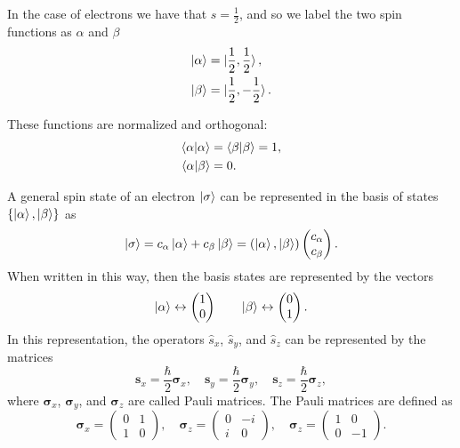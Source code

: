 \documentclass[../Main/chem532-notes.tex]{subfiles}
\begin{document}
In the case of electrons we have that $s = \frac{1}{2}$, and so we label the two spin functions as $\alpha$ and $\beta$
\begin{align}
\ket{\alpha} &= \ket{\frac{1}{2},\frac{1}{2}}, \\
\ket{\beta} &= \ket{\frac{1}{2},-\frac{1}{2}}.
\end{align}

These functions are normalized and orthogonal:
\begin{align}
\braket{\alpha | \alpha} &= \braket{\beta | \beta} = 1, \\
\braket{\alpha | \beta} &= 0. \label{eq:spin_orthogonality}
\end{align}

A general spin state of an electron $\ket{\sigma}$ can be represented in the basis of states $\{ \ket{\alpha}, \ket{\beta} \}$ as
\begin{equation}
\ket{\sigma} = c_\alpha \ket{\alpha} + c_\beta \ket{\beta} = ( \ket{\alpha}, \ket{\beta})
\begin{pmatrix}
c_\alpha \\
c_\beta
\end{pmatrix}.
\end{equation}
When written in this way, then the basis states are represented by the vectors
\begin{equation}
\ket{\alpha} \leftrightarrow 
\begin{pmatrix}
1 \\
0
\end{pmatrix}
\quad \quad
\ket{\beta} \leftrightarrow 
\begin{pmatrix}
0 \\
1
\end{pmatrix}.
\end{equation}
In this representation, the operators $\hat{s}_x$, $\hat{s}_y$, and $\hat{s}_z$ can be represented by the matrices
\begin{equation}
\mathbf{s}_x = \frac{\hbar}{2} \boldsymbol{\sigma}_x, \quad
\mathbf{s}_y = \frac{\hbar}{2} \boldsymbol{\sigma}_y, \quad
\mathbf{s}_z = \frac{\hbar}{2} \boldsymbol{\sigma}_z,
\end{equation}
where $\boldsymbol{\sigma}_x$, $\boldsymbol{\sigma}_y$, and $\boldsymbol{\sigma}_z$ are called Pauli matrices.
The Pauli matrices are defined as
\begin{equation}
\boldsymbol{\sigma}_x = 
\begin{pmatrix}
0 & 1 \\
1 & 0
\end{pmatrix}, \quad
\boldsymbol{\sigma}_z = 
\begin{pmatrix}
0 & -i \\
i & 0
\end{pmatrix}, \quad
\boldsymbol{\sigma}_z = 
\begin{pmatrix}
1 & 0 \\
0 & -1
\end{pmatrix}.
\end{equation}
\end{document}
